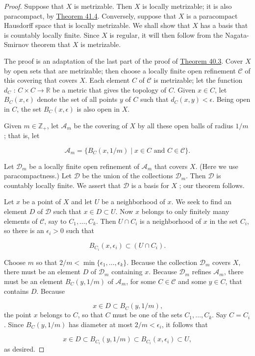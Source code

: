 \begin{proof}
Suppose that \(X\) is metrizable. Then \(X\) is locally metrizable; it is also paracompact, by \hyperref[thm:41.4]{Theorem 41.4}.
Conversely, suppose that \(X\) is a paracompact Hausdorff space that is locally metrizable. We shall show that \(X\) has a basis that is countably locally finite. Since \(X\) is regular, it will then follow from the Nagata-Smirnov theorem that \(X\) is metrizable.

The proof is an adaptation of the last part of the proof of \hyperref[thm:40.3]{Theorem 40.3}. Cover \(X\) by open sets that are metrizable; then choose a locally finite open refinement \(\mathcal{C}\) of this covering that covers \(X\). Each element \(C\) of \(\mathcal{C}\) is metrizable; let the function \(d_{C}\) : \(C \times C \rightarrow \mathbb{R}\) be a metric that gives the topology of \(C\). Given \(x \in C\), let \(B_{C}({x,\epsilon })\) denote the set of all points \(y\) of \(C\) such that \(d_{C}({x,y}) < \epsilon\). Being open in \(C\), the set \(B_{C}({x,\epsilon })\) is also open in \(X\).

Given \(m \in {\mathbb{Z}}_{ + }\), let \(\mathcal{A}_{m}\) be the covering of \(X\) by all these open balls of radius \(1/m\) ; that is, let

\[
\mathcal{A}_{m} = \{ {B_{C}({x,1/m}) \mid x \in C\text{ and }C \in \mathcal{C}}\}.
\]

Let \(\mathcal{D}_{m}\) be a locally finite open refinement of \(\mathcal{A}_{m}\) that covers \(X\). (Here we use paracompactness.) Let \(\mathcal{D}\) be the union of the collections \(\mathcal{D}_{m}\). Then \(\mathcal{D}\) is countably locally finite. We assert that \(\mathcal{D}\) is a basis for \(X\) ; our theorem follows.

Let \(x\) be a point of \(X\) and let \(U\) be a neighborhood of \(x\). We seek to find an element \(D\) of \(\mathcal{D}\) such that \(x \in D \subset U\). Now \(x\) belongs to only finitely many elements of \(\mathcal{C}\), say to \(C_{1},\ldots ,C_{k}\). Then \(U \cap {C}_{i}\) is a neighborhood of \(x\) in the set \(C_{i}\), so there is an \({\epsilon }_{i} > 0\) such that

\[
B_{C_{i}}({x,{\epsilon }_{i}}) \subset ({U \cap {C}_{i}}).
\]

Choose \(m\) so that \(2/m < \min \{ {{\epsilon }_{1},\ldots ,{\epsilon }_{k}}\}\). Because the collection \(\mathcal{D}_{m}\) covers \(X\), there must be an element \(D\) of \(\mathcal{D}_{m}\) containing \(x\). Because \(\mathcal{D}_{m}\) refines \(\mathcal{A}_{m}\), there must be an element \(B_{C}({y,1/m})\) of \(\mathcal{A}_{m}\), for some \(C \in \mathcal{C}\) and some \(y \in C\), that contains \(D\). Because

\[
x \in D \subset {B}_{C}({y,1/m}) \text{,}
\]
the point \(x\) belongs to \(C\), so that \(C\) must be one of the sets \(C_{1},\ldots ,C_{k}\). Say \(C = C_{i}\). Since \(B_{C}({y,1/m})\) has diameter at most \(2/m < {\epsilon }_{i}\), it follows that

\[
x \in D \subset {B}_{C_{i}}({y,1/m}) \subset {B}_{C_{i}}({x,{\epsilon }_{i}}) \subset U,
\]
as desired.
\end{proof}
